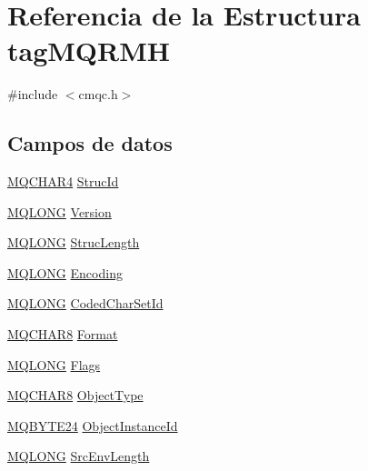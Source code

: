 \hypertarget{structtag_m_q_r_m_h}{}\section{Referencia de la Estructura tag\+M\+Q\+R\+M\+H}
\label{structtag_m_q_r_m_h}


{\ttfamily \#include $<$cmqc.\+h$>$}

\subsection*{Campos de datos}
\begin{DoxyCompactItemize}
\item 
\hyperlink{cmqc_8h_a12590e546ed66fda7cf21c1d5cefa31d}{M\+Q\+C\+H\+A\+R4} \hyperlink{structtag_m_q_r_m_h_a0530922ca944569b52601d74941f96e4}{Struc\+Id}
\item 
\hyperlink{cmqc_8h_a1fb8d28cbda3fa8766a9821230cdb6d5}{M\+Q\+L\+O\+N\+G} \hyperlink{structtag_m_q_r_m_h_a0656ef8f766b3907d394d88a35d7b7e9}{Version}
\item 
\hyperlink{cmqc_8h_a1fb8d28cbda3fa8766a9821230cdb6d5}{M\+Q\+L\+O\+N\+G} \hyperlink{structtag_m_q_r_m_h_a830af9a4a08c015b9a4b2d39d4d3420a}{Struc\+Length}
\item 
\hyperlink{cmqc_8h_a1fb8d28cbda3fa8766a9821230cdb6d5}{M\+Q\+L\+O\+N\+G} \hyperlink{structtag_m_q_r_m_h_a30167bf454a49a60fd3fe4e9e586af34}{Encoding}
\item 
\hyperlink{cmqc_8h_a1fb8d28cbda3fa8766a9821230cdb6d5}{M\+Q\+L\+O\+N\+G} \hyperlink{structtag_m_q_r_m_h_a4d8d1961a991850d1355cdf9b4680b8e}{Coded\+Char\+Set\+Id}
\item 
\hyperlink{cmqc_8h_abddcedb8c41fa262f2bd05dfec3e60a5}{M\+Q\+C\+H\+A\+R8} \hyperlink{structtag_m_q_r_m_h_a435a478822008713f8aaff89f369ed63}{Format}
\item 
\hyperlink{cmqc_8h_a1fb8d28cbda3fa8766a9821230cdb6d5}{M\+Q\+L\+O\+N\+G} \hyperlink{structtag_m_q_r_m_h_a8da770267273b200fa9c968fa2a0da57}{Flags}
\item 
\hyperlink{cmqc_8h_abddcedb8c41fa262f2bd05dfec3e60a5}{M\+Q\+C\+H\+A\+R8} \hyperlink{structtag_m_q_r_m_h_a1b4753b4825e88c34bdab97e9277176b}{Object\+Type}
\item 
\hyperlink{cmqc_8h_a2866d93c0ef84cfcda34cab5fd22fc5a}{M\+Q\+B\+Y\+T\+E24} \hyperlink{structtag_m_q_r_m_h_aed96c2686cc299fc94e1042a9f0c3920}{Object\+Instance\+Id}
\item 
\hyperlink{cmqc_8h_a1fb8d28cbda3fa8766a9821230cdb6d5}{M\+Q\+L\+O\+N\+G} \hyperlink{structtag_m_q_r_m_h_a286e0e177ce771ad66c635b688e91b6a}{Src\+Env\+Length}

\end{DoxyCompactItemize}
